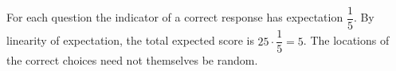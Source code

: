 For each question the indicator of a correct response has expectation $\dfrac{1}{5}$. By linearity of expectation, the total expected score is $25\cdot\dfrac{1}{5}=\boxed{5}$. The locations of the correct choices need not themselves be random.
